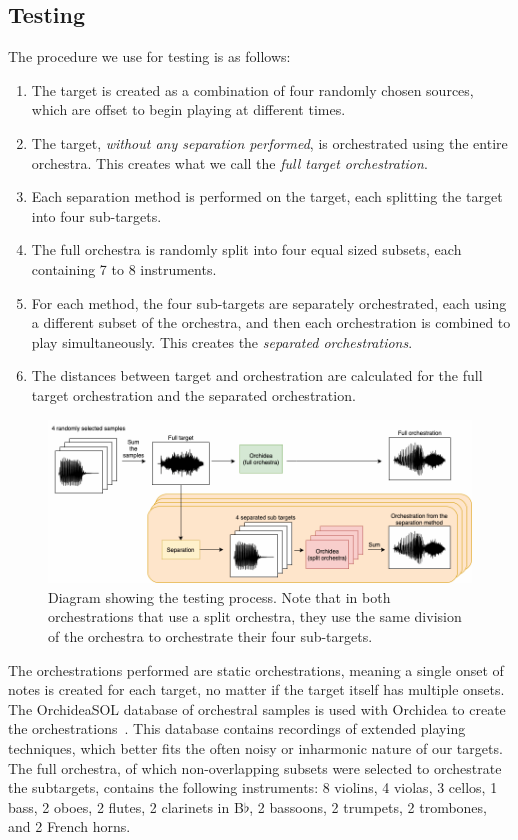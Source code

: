 \documentclass{article}
\begin{document}
    \subsection{Testing}\label{subsec:testing}
    The procedure we use for testing is as follows:
    \begin{enumerate}
      \item The target is created as a combination of four randomly chosen sources, which are offset to begin playing at different times.
      \item The target, \textit{without any separation performed}, is orchestrated using the entire orchestra. This creates what we call the \textit{full target orchestration}.
      \item Each separation method is performed on the target, each splitting the target into four sub-targets. 
      \item The full orchestra is randomly split into four equal sized subsets, each containing 7 to 8 instruments.
      \item For each method, the four sub-targets are separately orchestrated, each using a different subset of the orchestra, and then each orchestration is combined to play simultaneously. This creates the \textit{separated orchestrations}.
      \item The distances between target and orchestration are calculated for the full target orchestration and the separated orchestration.
    \end{enumerate} 

    \begin{figure}[t]
      \centering
        \includegraphics[width=\columnwidth]{figures/evaluation_diagram.png}
        \caption{Diagram showing the testing process. Note that in both orchestrations that use a split orchestra, they use the same division of the orchestra to orchestrate their four sub-targets.}\label{fig:eval_diagram}
    \end{figure}
    
    The orchestrations performed are static orchestrations, meaning a single onset of notes is created for each target, no matter if the target itself has multiple onsets. The OrchideaSOL database of orchestral samples is used with Orchidea to create the orchestrations~\cite{Cella2020c}. This database contains recordings of extended playing techniques, which better fits the often noisy or inharmonic nature of our targets. The full orchestra, of which non-overlapping subsets were selected to orchestrate the subtargets, contains the following instruments: 8 violins, 4 violas, 3 cellos, 1 bass, 2 oboes, 2 flutes, 2 clarinets in B$\flat$, 2 bassoons, 2 trumpets, 2 trombones, and 2 French horns.
    
\end{document}
